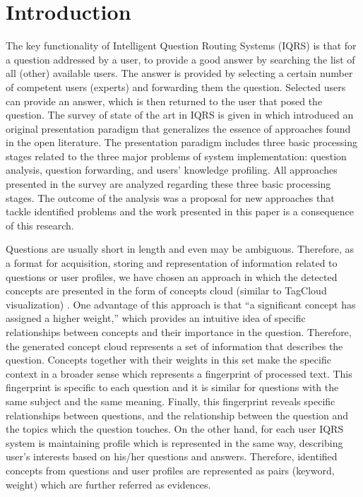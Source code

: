 \documentclass[conference]{IEEEtran}
\begin{document}
\section{Introduction}
The key functionality of Intelligent Question Routing Systems (IQRS) is that for a question addressed by a user, to provide a good answer by searching the list of all (other) available users. The answer is provided by selecting a certain number of competent users (experts) and forwarding them the question. Selected users can provide an answer, which is then returned to the user that posed the question. The survey of state of the art in IQRS is given in \cite{bib:survey2013} which introduced an original presentation paradigm that generalizes the essence of approaches found in the open literature. The presentation paradigm includes three basic processing stages related to the three major problems of system implementation: question analysis, question forwarding, and users' knowledge profiling. All approaches presented in the survey are analyzed regarding these three basic processing stages. The outcome of the analysis was a proposal for new approaches that tackle identified problems and the work presented in this paper is a consequence of this research.

Questions are usually short in length and even may be ambiguous. Therefore, as a format for acquisition, storing and representation of information related to questions or user profiles, we have chosen an approach in which the detected concepts are presented in the form of concepts cloud (similar to TagCloud visualization) \cite{bib:TAG07, bib:TAG08}. One advantage of this approach is that ``a significant concept has assigned a higher weight,'' which provides an intuitive idea of specific relationships between concepts and their importance in the question. Therefore, the generated concept cloud represents a set of information that describes the question. Concepts together with their weights in this set make the specific context in a broader sense which represents a fingerprint of processed text. This fingerprint is specific to each question and it is similar for questions with the same subject and the same meaning. Finally, this fingerprint reveals specific relationships between questions, and the relationship between the question and the topics which the question touches. On the other hand, for each user IQRS system is maintaining profile which is represented in the same way, describing user’s interests based on his/her questions and answers. Therefore, identified concepts from questions and user profiles are represented as pairs (keyword, weight) which are further referred as evidences.
\end{document}
